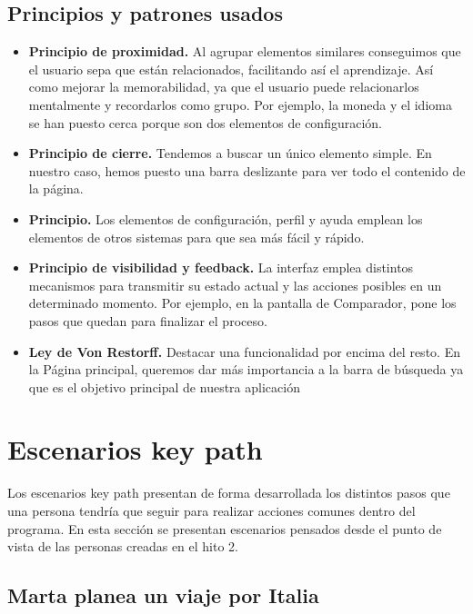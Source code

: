 \subsection{Principios y patrones usados}

\begin{itemize}

      \item \textbf{Principio de proximidad.} Al agrupar elementos similares conseguimos que el usuario sepa que están relacionados, facilitando así el aprendizaje. Así como mejorar la memorabilidad, ya que el usuario puede relacionarlos mentalmente y recordarlos como grupo.
            Por ejemplo, la moneda y el idioma se han puesto cerca porque son dos elementos de configuración.
      \item \textbf{Principio de cierre.} Tendemos a buscar un único elemento simple.
            En nuestro caso, hemos puesto una barra deslizante para ver todo el contenido de la página.
      \item \textbf{Principio.} Los elementos de configuración, perfil y ayuda emplean los elementos de otros sistemas para que sea más fácil y rápido.
      \item \textbf{Principio de visibilidad y feedback.} La interfaz emplea distintos mecanismos para transmitir su estado actual y las acciones posibles en un determinado momento.
            Por ejemplo, en la pantalla de Comparador, pone los pasos que quedan para finalizar el proceso.
      \item \textbf{Ley de Von Restorff.} Destacar una funcionalidad por encima del resto.
            En la Página principal, queremos dar más importancia a la barra de búsqueda ya que es el objetivo principal de nuestra aplicación

\end{itemize}

\section{Escenarios key path}
Los escenarios key path presentan de forma desarrollada los distintos pasos que
una persona tendría que seguir para realizar acciones comunes dentro del
programa. En esta sección se presentan escenarios pensados desde el punto de
vista de las personas creadas en el hito 2.

\subsection{Marta planea un viaje por Italia}

